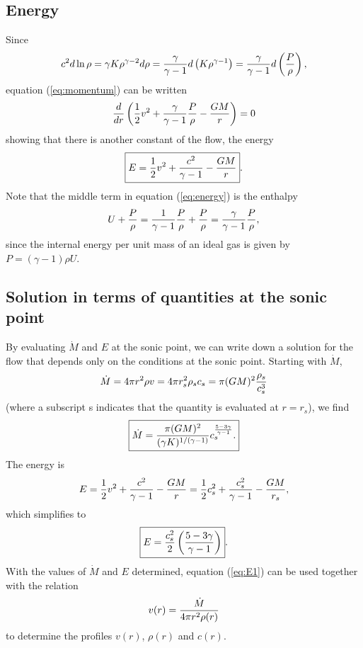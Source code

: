 \documentclass[preprint,12pt]{aastex}
\begin{document}
\subsection{Energy}

Since
\begin{equation}
c^2d\ln\rho = \gamma K \rho^{\gamma-2}d\rho = {\gamma\over \gamma-1}d\left(K \rho^{\gamma-1} \right)={\gamma\over \gamma-1}d\left({P\over \rho} \right),
\end{equation}
equation (\ref{eq:momentum}) can be written
\begin{equation}\label{eq:energy}
{d\over dr}\left({1\over 2}v^2 + {\gamma \over \gamma-1}{P\over\rho} -{GM\over r}\right)=0
\end{equation}
showing that there is another constant of the flow, the energy
\begin{equation}
\boxed{
E = {1\over 2}v^2 + {c^2\over \gamma-1} -{GM\over r}
}
.
\end{equation}
Note that the middle term in equation (\ref{eq:energy}) is the enthalpy
\begin{equation}
U + {P\over \rho} = {1\over \gamma-1}{P\over\rho} + {P\over \rho} =  {\gamma \over \gamma-1}{P\over\rho},
\end{equation}
since the internal energy per unit mass of an ideal gas is given by $P = (\gamma - 1)\rho U$.

\subsection{Solution in terms of quantities at the sonic point}

By evaluating $\dot M$ and $E$ at the sonic point, we can write down a solution for the flow that depends only on the conditions at the sonic point. Starting with $\dot M$,
\begin{equation}
\dot M = 4\pi r^2 \rho v = 4\pi r_s^2 \rho_s c_s = \pi (GM)^2 {\rho_s\over c_s^3}
\end{equation}
(where a subscript s indicates that the quantity is evaluated at $r=r_s$), we find
\begin{equation}
\boxed{
\dot M =  {\pi (GM)^2\over (\gamma K)^{1/(\gamma-1)}} c_s^{5-3\gamma\over \gamma-1}.
}
\end{equation}
The energy is
\begin{equation}\label{eq:E1}
E = {1\over 2}v^2 + {c^2\over \gamma-1} -{GM\over r} = {1\over 2}c_s^2 + {c_s^2\over \gamma-1} -{GM\over r_s},
\end{equation}
which simplifies to
\begin{equation}
\boxed{
E = {c_s^2\over 2}\left({5-3\gamma\over \gamma-1}\right)
}.
\end{equation}
With the values of $\dot M$ and $E$ determined, equation (\ref{eq:E1}) can be used together with the relation
\begin{equation}
v(r) = {\dot M\over 4\pi r^2\rho(r)}
\end{equation}
to determine the profiles $v(r)$, $\rho(r)$ and $c(r)$.
\end{document}
